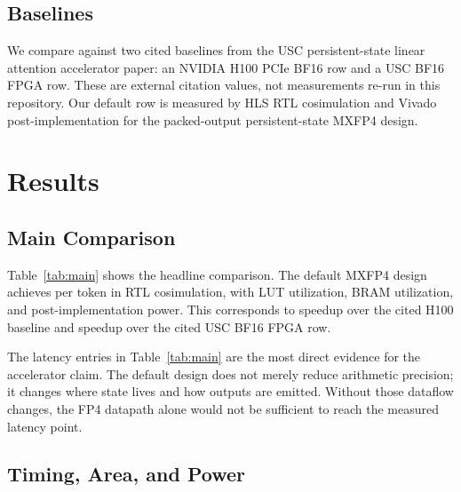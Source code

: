 \documentclass[conference]{IEEEtran}
\newcommand{\PaperRoot}{}
\renewcommand{\PaperRoot}{paper/}%
\renewcommand{\PaperRoot}{}%
\newcommand{\PaperInput}[1]{}
\begin{document}
\subsection{Baselines}

We compare against two cited baselines from the USC persistent-state linear
attention accelerator paper: an NVIDIA H100 PCIe BF16 row and a USC BF16 FPGA
row. These are external citation values, not measurements re-run in this
repository. Our default row is measured by HLS RTL cosimulation and Vivado
post-implementation for the packed-output persistent-state MXFP4 design.

\section{Results}
\label{sec:results}

\subsection{Main Comparison}

Table~\ref{tab:main} shows the headline comparison. The default MXFP4 design
achieves \OursMxfpFourBThirtyTwoLatencyUs per token in RTL cosimulation, with
\OursMxfpFourBThirtyTwoLutPct LUT utilization, \OursMxfpFourBThirtyTwoBramPct
BRAM utilization, and \OursMxfpFourBThirtyTwoPowerW post-implementation power.
This corresponds to \HeadlineSpeedupVsHOneHundred speedup over the cited H100
baseline and \HeadlineSpeedupVsUsc speedup over the cited USC BF16 FPGA row.

\begin{table}[t]
  \centering
  \caption{Main latency, area, and power comparison. Baseline rows are external
  citation values; our row is extracted from RTL cosimulation and Vivado
  post-implementation reports.}
  \label{tab:main}
  \resizebox{\linewidth}{!}{\PaperInput{tables/main_results.tex}}
\end{table}

The latency entries in Table~\ref{tab:main} are the most direct evidence for
the accelerator claim. The default design does not merely reduce arithmetic
precision; it changes where state lives and how outputs are emitted. Without
those dataflow changes, the FP4 datapath alone would not be sufficient to reach
the measured latency point.

\subsection{Timing, Area, and Power}
\end{document}
